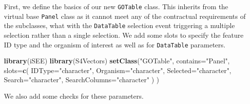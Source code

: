 \documentclass[
]{book}
\newenvironment{Shaded}{\begin{snugshade}}{\end{snugshade}}
\newcommand{\DataTypeTok}[1]{\textcolor[rgb]{0.13,0.29,0.53}{#1}}
\newcommand{\KeywordTok}[1]{\textcolor[rgb]{0.13,0.29,0.53}{\textbf{#1}}}
\newcommand{\NormalTok}[1]{#1}
\newcommand{\StringTok}[1]{\textcolor[rgb]{0.31,0.60,0.02}{#1}}
\begin{document}
First, we define the basics of our new \texttt{GOTable} class.
This inherits from the virtual base \texttt{Panel} class as it cannot meet any of the contractual requirements of the subclasses,
what with the \texttt{DataTable} selection event triggering a multiple selection rather than a single selection.
We add some slots to specify the feature ID type and the organism of interest as well as for \texttt{DataTable} parameters.

\begin{Shaded}
\begin{Highlighting}[]
\KeywordTok{library}\NormalTok{(iSEE)}
\KeywordTok{library}\NormalTok{(S4Vectors)}
\KeywordTok{setClass}\NormalTok{(}\StringTok{"GOTable"}\NormalTok{, }\DataTypeTok{contains=}\StringTok{"Panel"}\NormalTok{,}
    \DataTypeTok{slots=}\KeywordTok{c}\NormalTok{(}
        \DataTypeTok{IDType=}\StringTok{"character"}\NormalTok{,}
        \DataTypeTok{Organism=}\StringTok{"character"}\NormalTok{,}
        \DataTypeTok{Selected=}\StringTok{"character"}\NormalTok{,}
        \DataTypeTok{Search=}\StringTok{"character"}\NormalTok{,}
        \DataTypeTok{SearchColumns=}\StringTok{"character"}
\NormalTok{    )}
\NormalTok{)}
\end{Highlighting}
\end{Shaded}

We also add some checks for these parameters.
\end{document}
